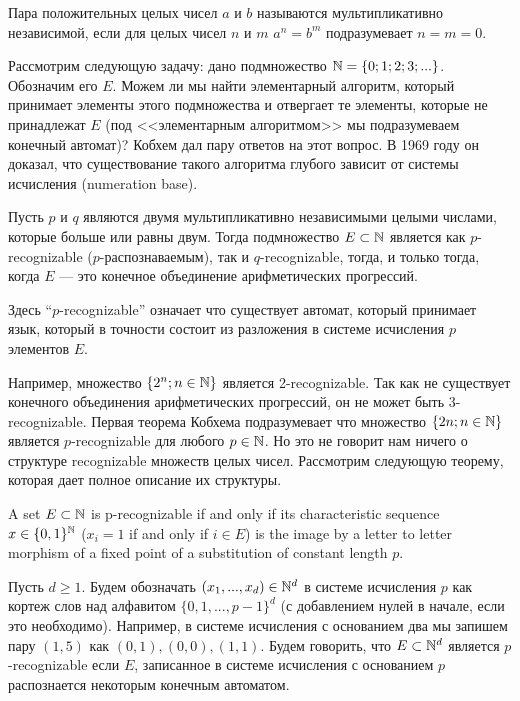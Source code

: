     \begin{Def}
        Пара положительных целых чисел $a$ и $b$ называются мультипликативно независимой, если для целых чисел $n$ и $m$ $a^n = b^m$ подразумевает $n = m = 0$.
    \end{Def}
    \begin{Rem}
        Рассмотрим следующую задачу: дано подмножество $\mathbb{N} = \{0;1;2;3;...\}$. Обозначим его $E$. Можем ли мы найти элементарный алгоритм, который принимает элементы этого подмножества и отвергает те элементы, которые не принадлежат $E$ (под <<элементарным алгоритмом>> мы подразумеваем конечный автомат)? Кобхем дал пару ответов на этот вопрос. В 1969 году он доказал, что существование такого алгоритма глубого зависит от системы исчисления (numeration base). 
    \end{Rem}
    \begin{Thm}
        Пусть $p$ и $q$ являются двумя мультипликативно независимыми целыми числами, которые больше или равны двум. Тогда подмножество $E \subset \mathbb{N}$ является как $p$-recognizable ($p$-распознаваемым), так и $q$-recognizable, тогда, и только тогда, когда $E$ --- это конечное объединение арифметических прогрессий.
    \end{Thm}
    \begin{Rem}
        Здесь ``$p$-recognizable'' означает что существует автомат, который принимает язык, который в точности состоит из разложения в системе исчисления $p$ элементов $E$.
    \end{Rem}
    \begin{Example}
        Например, множество $\{2^n; n \in \mathbb{N}\}$ является 2-recognizable. Так как не существует конечного объединения арифметических прогрессий, он не может быть 3-recognizable. Первая теорема Кобхема подразумевает что множество $\{2n;n \in \mathbb{N}\}$ является $p$-recognizable для любого $p \in \mathbb{N}$. Но это не говорит нам ничего о структуре recognizable множеств целых чисел. Рассмотрим следующую теорему, которая дает полное описание их структуры. 
    \end{Example}
    \begin{Thm}
        A set $E \subset \mathbb{N}$ is p-recognizable if and only if its characteristic sequence $x \in \{0,1\}^{\mathbb{N}}$ ($x_i = 1$ if and only if $i \in E$) is the image by a letter to letter morphism of a ﬁxed point of a substitution of constant length $p$.
    \end{Thm}
    \begin{Rem}
        Пусть $d \geq 1$. Будем обозначать $(x_1, ..., x_d) \in \mathbb{N}^d$ в системе исчисления $p$ как кортеж слов над алфавитом $\{0, 1, ..., p - 1\}^d$ (с добавлением нулей в начале, если это необходимо). Например, в системе исчисления с основанием два мы запишем пару $(1,5)$ как $(0,1), (0,0), (1,1)$. Будем говорить, что $E \subset \mathbb{N}^d$ является $p$-recognizable если $E$, записанное в системе исчисления с основанием $p$ распознается некоторым конечным автоматом.
    \end{Rem}
